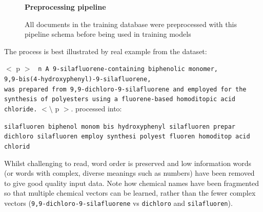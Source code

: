 \begin{figure}[H]
    \centering
    \textbf{Preprocessing pipeline}\par\medskip
    \caption[Preprocessing Pipeline]{All documents in the training database were preprocessed with this pipeline schema before being used in training models}
     \label{fig:SANPIPE}
\end{figure}
The process is best illustrated by real example from the dataset:

$<$ p $>$
\texttt{ n A 9-silafluorene-containing biphenolic monomer,\\ 9,9-bis(4-hydroxyphenyl)-9-silafluorene, \\ was prepared from 9,9-dichloro-9-silafluorene and employed for the synthesis of polyesters using a fluorene-based homoditopic acid chloride.} $< \setminus$ p $>$.
\cite{sanex} 
processed into:

\texttt{silafluoren biphenol monom bis hydroxyphenyl silafluoren prepar dichloro silafluoren employ synthesi polyest fluoren homoditop acid chlorid}

Whilst challenging to read, word order is preserved and low information words (or words with complex, diverse meanings such as numbers) have been removed to give good quality input data. Note how chemical names have been fragmented so that multiple chemical vectors can be learned, rather than the fewer complex vectors (\texttt{9,9-dichloro-9-silafluorene} vs \texttt{dichloro} and \texttt{silafluoren}).


